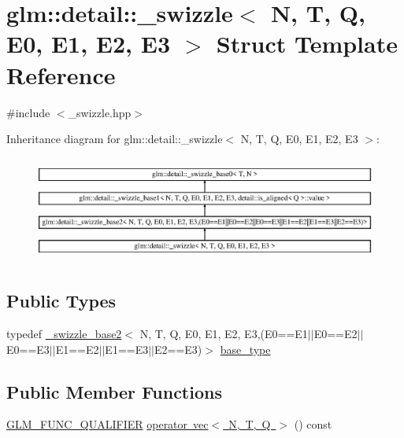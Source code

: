 \hypertarget{structglm_1_1detail_1_1__swizzle}{}\section{glm\+:\+:detail\+:\+:\+\_\+swizzle$<$ N, T, Q, E0, E1, E2, E3 $>$ Struct Template Reference}
\label{structglm_1_1detail_1_1__swizzle}


{\ttfamily \#include $<$\+\_\+swizzle.\+hpp$>$}

Inheritance diagram for glm\+:\+:detail\+:\+:\+\_\+swizzle$<$ N, T, Q, E0, E1, E2, E3 $>$\+:\begin{figure}[H]
\begin{center}
\leavevmode
\includegraphics[height=3.533123cm]{structglm_1_1detail_1_1__swizzle}
\end{center}
\end{figure}
\subsection*{Public Types}
\begin{DoxyCompactItemize}
\item 
typedef \mbox{\hyperlink{structglm_1_1detail_1_1__swizzle__base2}{\+\_\+swizzle\+\_\+base2}}$<$ N, T, Q, E0, E1, E2, E3,(E0==E1$\vert$$\vert$E0==E2$\vert$$\vert$E0==E3$\vert$$\vert$E1==E2$\vert$$\vert$E1==E3$\vert$$\vert$E2==E3)$>$ \mbox{\hyperlink{structglm_1_1detail_1_1__swizzle_ac055459bca5651cfea9466ffd3a0daeb}{base\+\_\+type}}
\end{DoxyCompactItemize}
\subsection*{Public Member Functions}
\begin{DoxyCompactItemize}
\item 
\mbox{\hyperlink{setup_8hpp_a33fdea6f91c5f834105f7415e2a64407}{G\+L\+M\+\_\+\+F\+U\+N\+C\+\_\+\+Q\+U\+A\+L\+I\+F\+I\+ER}} \mbox{\hyperlink{structglm_1_1detail_1_1__swizzle_ab4237b43cd0b0b081668ba6ab1072903}{operator vec$<$ N, T, Q $>$}} () const
\end{DoxyCompactItemize}
